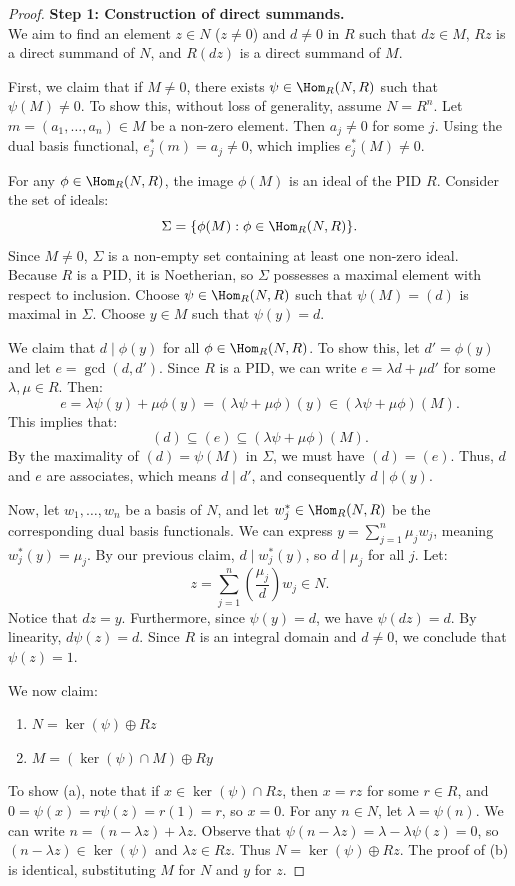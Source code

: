 \documentclass[a4paper,12pt]{article}
\begin{document}
\begin{proof}
    \textbf{Step 1: Construction of direct summands.}\\
    We aim to find an element $z \in N$ ($z \neq 0$) and $d \neq 0$ in $R$ such that $dz \in M$, $Rz$ is a direct summand of $N$, and $R(dz)$ is a direct summand of $M$. 

    First, we claim that if $M \neq 0$, there exists $\psi \in \Hom_R(N, R)$ such that $\psi(M) \neq 0$. To show this, without loss of generality, assume $N = R^n$. Let $m = (a_1, \dots, a_n) \in M$ be a non-zero element. Then $a_j \neq 0$ for some $j$. Using the dual basis functional, $e_j^*(m) = a_j \neq 0$, which implies $e_j^*(M) \neq 0$.

    For any $\phi \in \Hom_R(N, R)$, the image $\phi(M)$ is an ideal of the PID $R$. Consider the set of ideals:
    \[
    \Sigma = \{\phi(M) : \phi \in \Hom_R(N, R)\}.
    \]
    Since $M \neq 0$, $\Sigma$ is a non-empty set containing at least one non-zero ideal. Because $R$ is a PID, it is Noetherian, so $\Sigma$ possesses a maximal element with respect to inclusion. Choose $\psi \in \Hom_R(N, R)$ such that $\psi(M) = (d)$ is maximal in $\Sigma$. Choose $y \in M$ such that $\psi(y) = d$.

    We claim that $d \mid \phi(y)$ for all $\phi \in \Hom_R(N, R)$. To show this, let $d' = \phi(y)$ and let $e = \gcd(d, d')$. Since $R$ is a PID, we can write $e = \lambda d + \mu d'$ for some $\lambda, \mu \in R$. Then:
    \[
    e = \lambda \psi(y) + \mu \phi(y) = (\lambda \psi + \mu \phi)(y) \in (\lambda \psi + \mu \phi)(M).
    \]
    This implies that:
    \[
    (d) \subseteq (e) \subseteq (\lambda \psi + \mu \phi)(M).
    \]
    By the maximality of $(d) = \psi(M)$ in $\Sigma$, we must have $(d) = (e)$. Thus, $d$ and $e$ are associates, which means $d \mid d'$, and consequently $d \mid \phi(y)$.

    Now, let $w_1, \dots, w_n$ be a basis of $N$, and let $w_j^* \in \Hom_R(N, R)$ be the corresponding dual basis functionals. We can express $y = \sum_{j=1}^n \mu_j w_j$, meaning $w_j^*(y) = \mu_j$. By our previous claim, $d \mid w_j^*(y)$, so $d \mid \mu_j$ for all $j$. Let:
    \[
    z = \sum_{j=1}^n \left( \frac{\mu_j}{d} \right) w_j \in N.
    \]
    Notice that $dz = y$. Furthermore, since $\psi(y) = d$, we have $\psi(dz) = d$. By linearity, $d\psi(z) = d$. Since $R$ is an integral domain and $d \neq 0$, we conclude that $\psi(z) = 1$.

    We now claim:
    \begin{enumerate}[label=(\alph*)]
        \item $N = \ker(\psi) \oplus Rz$
        \item $M = (\ker(\psi) \cap M) \oplus Ry$
    \end{enumerate}
    To show (a), note that if $x \in \ker(\psi) \cap Rz$, then $x = rz$ for some $r \in R$, and $0 = \psi(x) = r\psi(z) = r(1) = r$, so $x = 0$. For any $n \in N$, let $\lambda = \psi(n)$. We can write $n = (n - \lambda z) + \lambda z$. Observe that $\psi(n - \lambda z) = \lambda - \lambda \psi(z) = 0$, so $(n - \lambda z) \in \ker(\psi)$ and $\lambda z \in Rz$. Thus $N = \ker(\psi) \oplus Rz$. The proof of (b) is identical, substituting $M$ for $N$ and $y$ for $z$.


\end{proof}
\end{document}
